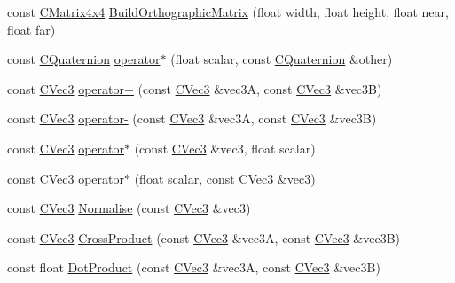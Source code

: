 \begin{DoxyCompactItemize}
\item 
const \hyperlink{class_slim_1_1_c_matrix4x4}{C\+Matrix4x4} \hyperlink{namespace_slim_a611996340ce5aadc7bb84ee2b1557cb5}{Build\+Orthographic\+Matrix} (float width, float height, float near, float far)
\item 
const \hyperlink{class_slim_1_1_c_quaternion}{C\+Quaternion} \hyperlink{namespace_slim_a7ed0c4574df5bd57c20e5e76c9649624}{operator$\ast$} (float scalar, const \hyperlink{class_slim_1_1_c_quaternion}{C\+Quaternion} \&other)
\item 
const \hyperlink{class_slim_1_1_c_vec3}{C\+Vec3} \hyperlink{namespace_slim_aa87e6927279f2e69880e753276acbbf5}{operator+} (const \hyperlink{class_slim_1_1_c_vec3}{C\+Vec3} \&vec3\+A, const \hyperlink{class_slim_1_1_c_vec3}{C\+Vec3} \&vec3\+B)
\item 
const \hyperlink{class_slim_1_1_c_vec3}{C\+Vec3} \hyperlink{namespace_slim_a73c8aeaa788d58fc8249e551894a25dc}{operator-\/} (const \hyperlink{class_slim_1_1_c_vec3}{C\+Vec3} \&vec3\+A, const \hyperlink{class_slim_1_1_c_vec3}{C\+Vec3} \&vec3\+B)
\item 
const \hyperlink{class_slim_1_1_c_vec3}{C\+Vec3} \hyperlink{namespace_slim_a6d8d6bdf8e8b68e585cfe2146de265d7}{operator$\ast$} (const \hyperlink{class_slim_1_1_c_vec3}{C\+Vec3} \&vec3, float scalar)
\item 
const \hyperlink{class_slim_1_1_c_vec3}{C\+Vec3} \hyperlink{namespace_slim_a796709e494493a3eb692815ccc8533e7}{operator$\ast$} (float scalar, const \hyperlink{class_slim_1_1_c_vec3}{C\+Vec3} \&vec3)
\item 
const \hyperlink{class_slim_1_1_c_vec3}{C\+Vec3} \hyperlink{namespace_slim_a9d18644ad5ad7c35e0a566e9628b48a5}{Normalise} (const \hyperlink{class_slim_1_1_c_vec3}{C\+Vec3} \&vec3)
\item 
const \hyperlink{class_slim_1_1_c_vec3}{C\+Vec3} \hyperlink{namespace_slim_a5275fcd11b6903747102ac76cf66c8c7}{Cross\+Product} (const \hyperlink{class_slim_1_1_c_vec3}{C\+Vec3} \&vec3\+A, const \hyperlink{class_slim_1_1_c_vec3}{C\+Vec3} \&vec3\+B)
\item 
const float \hyperlink{namespace_slim_a9de80b1319ed1fa9b847d977a923598c}{Dot\+Product} (const \hyperlink{class_slim_1_1_c_vec3}{C\+Vec3} \&vec3\+A, const \hyperlink{class_slim_1_1_c_vec3}{C\+Vec3} \&vec3\+B)
\end{DoxyCompactItemize}
